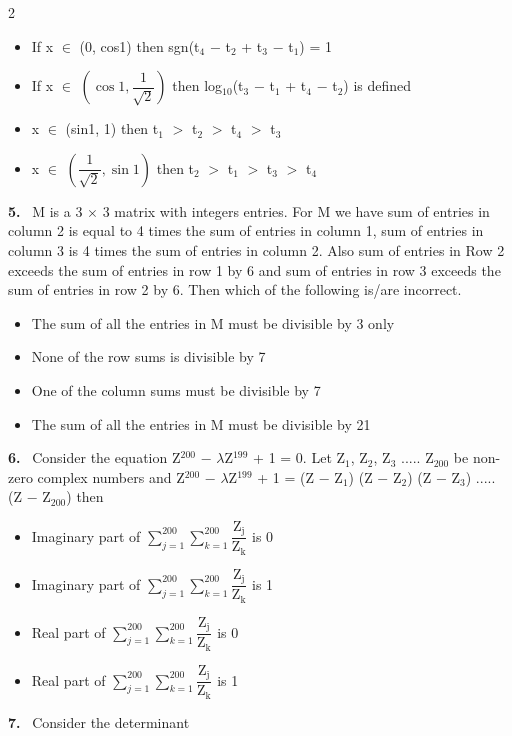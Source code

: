 \documentclass[10pt]{extarticle}
\newcommand{\qn}[1]{\par\smallskip\noindent\textbf{#1.}~}
\newenvironment{qoptions}{\begin{itemize}[leftmargin=1.8em,itemsep=1pt,topsep=2pt,label={}]}{\end{itemize}}
\newcommand{\opt}[2]{\item[(#1)] #2}
\begin{document}
\begin{multicols}{2}
\begin{qoptions}
\opt{A}{If x $\in$ (0, cos1) then sgn(t$_4$ $-$ t$_2$ + t$_3$ $-$ t$_1$) = 1}
\opt{B}{If x $\in$ $\left(\cos 1,\dfrac{1}{\sqrt{2}}\right)$ then log$_{10}$(t$_3$ $-$ t$_1$ + t$_4$ $-$ t$_2$) is defined}
\opt{C}{x $\in$ (sin1, 1) then t$_1$ $>$ t$_2$ $>$ t$_4$ $>$ t$_3$}
\opt{D}{x $\in$ $\left(\dfrac{1}{\sqrt{2}},\sin 1\right)$ then t$_2$ $>$ t$_1$ $>$ t$_3$ $>$ t$_4$}
\end{qoptions}
\qn{5} M is a 3 $\times$ 3 matrix with integers entries. For M we have sum of entries in column 2 is equal to 4 times the sum of entries in column 1, sum of entries in column 3 is 4 times the sum of entries in column 2. Also sum of entries in Row 2 exceeds the sum of entries in row 1 by 6 and sum of entries in row 3 exceeds the sum of entries in row 2 by 6. Then which of the following is/are incorrect.
\begin{qoptions}
\opt{A}{The sum of all the entries in M must be divisible by 3 only}
\opt{B}{None of the row sums is divisible by 7}
\opt{C}{One of the column sums must be divisible by 7}
\opt{D}{The sum of all the entries in M must be divisible by 21}
\end{qoptions}
\qn{6} Consider the equation Z$^{200}$ $-$ $\lambda$Z$^{199}$ + 1 = 0. Let Z$_1$, Z$_2$, Z$_3$ ..... Z$_{200}$ be non-zero complex numbers and Z$^{200}$ $-$ $\lambda$Z$^{199}$ + 1 = (Z $-$ Z$_1$) (Z $-$ Z$_2$) (Z $-$ Z$_3$) ..... (Z $-$ Z$_{200}$) then
\begin{qoptions}
\opt{A}{Imaginary part of $\displaystyle\sum_{j=1}^{200}\sum_{k=1}^{200}\dfrac{\text{Z}_\text{j}}{\text{Z}_\text{k}}$ is 0}
\opt{B}{Imaginary part of $\displaystyle\sum_{j=1}^{200}\sum_{k=1}^{200}\dfrac{\text{Z}_\text{j}}{\text{Z}_\text{k}}$ is 1}
\opt{C}{Real part of $\displaystyle\sum_{j=1}^{200}\sum_{k=1}^{200}\dfrac{\text{Z}_\text{j}}{\text{Z}_\text{k}}$ is 0}
\opt{D}{Real part of $\displaystyle\sum_{j=1}^{200}\sum_{k=1}^{200}\dfrac{\text{Z}_\text{j}}{\text{Z}_\text{k}}$ is 1}
\end{qoptions}
\qn{7} Consider the determinant\par\noindent{}\par

\end{multicols}
\end{document}
